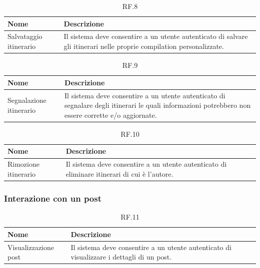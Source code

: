 \documentclass{natourDoc}
\begin{document}
\begin{table}[H]
	\centering
	\begin{tabular}{ |p{5cm}|p{10.3cm}| }
		\hline
		\rowcolor{PineGreen!70}
		\textbf{Nome}          & \textbf{Descrizione}                                                        \\
		\hline
		Salvataggio itinerario & Il sistema deve consentire a un utente autenticato di salvare gli itinerari
		nelle proprie compilation personalizzate.                                                            \\
		\hline
	\end{tabular}
	\caption{RF.8}
	\label{table:8}
\end{table}

\begin{table}[H]
	\centering
	\begin{tabular}{ |p{5cm}|p{10.3cm}| }
		\hline
		\rowcolor{PineGreen!70}
		\textbf{Nome}           & \textbf{Descrizione}                                                            \\
		\hline
		Segnalazione itinerario & Il sistema deve consentire a un utente autenticato di segnalare degli itinerari
		le quali informazioni potrebbero non essere corrette e/o aggiornate.                                      \\
		\hline
	\end{tabular}
	\caption{RF.9}
	\label{table:9}
\end{table}

\begin{table}[H]
	\centering
	\begin{tabular}{ |p{5cm}|p{10.3cm}| }
		\hline
		\rowcolor{PineGreen!70}
		\textbf{Nome}        & \textbf{Descrizione}                                                             \\
		\hline
		Rimozione itinerario & Il sistema deve consentire a un utente autenticato di eliminare itinerari di cui
		è l'autore.                                                                                             \\
		\hline
	\end{tabular}
	\caption{RF.10}
	\label{table:10}
\end{table}

\subsubsection{Interazione con un post}
\begin{table}[H]
	\centering
	\begin{tabular}{ |p{5cm}|p{10.3cm}| }
		\hline
		\rowcolor{PineGreen!70}
		\textbf{Nome}        & \textbf{Descrizione}                                               \\
		\hline
		Visualizzazione post & Il sistema deve consentire a un utente autenticato di visualizzare
		i dettagli di un post.                                                                    \\
		\hline
	\end{tabular}
	\caption{RF.11}
	\label{table:11}
\end{table}
\end{document}

